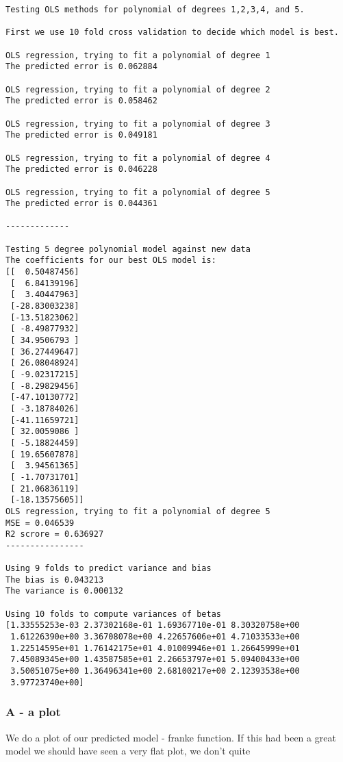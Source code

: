 \documentclass[11pt]{article}
\begin{document}
    \begin{Verbatim}[commandchars=\\\{\}]
Testing OLS methods for polynomial of degrees 1,2,3,4, and 5.

First we use 10 fold cross validation to decide which model is best.

OLS regression, trying to fit a polynomial of degree 1 
The predicted error is 0.062884

OLS regression, trying to fit a polynomial of degree 2 
The predicted error is 0.058462

OLS regression, trying to fit a polynomial of degree 3 
The predicted error is 0.049181

OLS regression, trying to fit a polynomial of degree 4 
The predicted error is 0.046228

OLS regression, trying to fit a polynomial of degree 5 
The predicted error is 0.044361

-------------

Testing 5 degree polynomial model against new data
The coefficients for our best OLS model is:
[[  0.50487456]
 [  6.84139196]
 [  3.40447963]
 [-28.83003238]
 [-13.51823062]
 [ -8.49877932]
 [ 34.9506793 ]
 [ 36.27449647]
 [ 26.08048924]
 [ -9.02317215]
 [ -8.29829456]
 [-47.10130772]
 [ -3.18784026]
 [-41.11659721]
 [ 32.0059086 ]
 [ -5.18824459]
 [ 19.65607878]
 [  3.94561365]
 [ -1.70731701]
 [ 21.06836119]
 [-18.13575605]]
OLS regression, trying to fit a polynomial of degree 5 
MSE = 0.046539
R2 scrore = 0.636927
----------------

Using 9 folds to predict variance and bias
The bias is 0.043213
The variance is 0.000132

Using 10 folds to compute variances of betas
[1.33555253e-03 2.37302168e-01 1.69367710e-01 8.30320758e+00
 1.61226390e+00 3.36708078e+00 4.22657606e+01 4.71033533e+00
 1.22514595e+01 1.76142175e+01 4.01009946e+01 1.26645999e+01
 7.45089345e+00 1.43587585e+01 2.26653797e+01 5.09400433e+00
 3.50051075e+00 1.36496341e+00 2.68100217e+00 2.12393538e+00
 3.97723740e+00]

    \end{Verbatim}

    \subsubsection{A - a plot}\label{a---a-plot}

We do a plot of our predicted model - franke function. If this had been
a great model we should have seen a very flat plot, we don't quite
\end{document}
